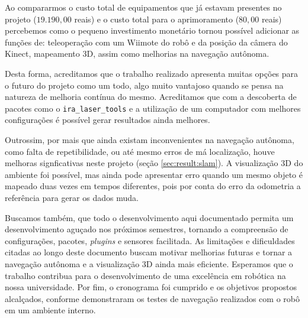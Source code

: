 Ao compararmos o custo total de equipamentos que já estavam presentes no projeto ($19.190,00$ reais) e o custo total para o aprimoramento ($80,00$ reais) percebemos como o pequeno investimento monetário tornou possível adicionar as funções de: teleoperação com um Wiimote do robô e da posição da câmera do Kinect, mapeamento 3D, assim como melhorias na navegação autônoma. 

Desta forma, acreditamos que o trabalho realizado apresenta muitas opções para o futuro do projeto como um todo, algo muito vantajoso quando se pensa na natureza de melhoria contínua do mesmo. Acreditamos que com a descoberta de pacotes como o \verb|ira_laser_tools| e a utilização de um computador com melhores configurações é possível gerar resultados ainda melhores.

Outrossim, por mais que ainda existam inconvenientes na navegação autônoma, como falta de repetibilidade, ou até mesmo erros de má localização, houve melhoras signficativas neste projeto (seção \ref{sec:result:slam}). A visualização 3D do ambiente foi possível, mas ainda pode apresentar erro quando um mesmo objeto é mapeado duas vezes em tempos diferentes, pois por conta do erro da odometria a referência para gerar os dados muda.

Buscamos também, que todo o desenvolvimento aqui documentado permita um desenvolvimento aguçado nos próximos semestres, tornando a compreensão de configurações, pacotes, \textit{plugins} e sensores facilitada. As limitações e dificuldades citadas ao longo deste documento buscam motivar melhorias futuras e tornar a navegação autônoma e a visualização 3D ainda mais eficiente. Esperamos que o trabalho contribua para o desenvolvimento de uma excelência em robótica na nossa universidade. Por fim, o cronograma foi cumprido e os objetivos propostos alcalçados, conforme demonstraram os testes de navegação realizados com o robô em um ambiente interno.